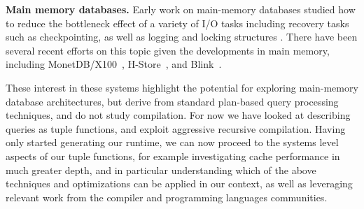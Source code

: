 \noindent \textbf{Main memory databases.}
Early work on main-memory databases studied how to reduce the bottleneck effect
of a variety of I/O tasks including recovery tasks such as checkpointing, as well
as logging and locking structures \cite{bohannon-sigmod:99}. There have been
several recent efforts on this topic given the developments in main memory,
including MonetDB/X100~\cite{boncz-cidr:05}, H-Store~\cite{kallman-pvldb:08},
and Blink~\cite{raman-icde:08}.

These interest in these systems highlight the potential for exploring
main-memory database architectures, but derive from standard plan-based query
processing techniques, and do not study compilation.  For now we have looked at
describing queries as tuple functions, and exploit aggressive recursive
compilation. Having only started generating our runtime, we can now
proceed to the systems level aspects of our tuple functions, for example
investigating cache performance in much greater depth, and in particular
understanding which of the above techniques and optimizations can be applied in
our context, as well as leveraging relevant work from the compiler and
programming languages communities.

